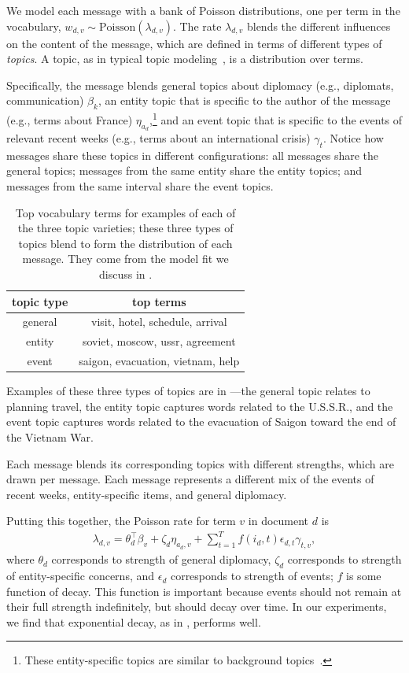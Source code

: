 We model each message with a bank of Poisson distributions, one per
term in the vocabulary, $w_{d,v} \sim \textrm{Poisson}(\lambda_{d,v})$.
The rate $\lambda_{d,v}$ blends the different influences on the
content of the message, which are defined in terms of different types
of \textit{topics}. A topic, as in typical topic modeling~\cite{Blei:2003,canny2004gap,Gopalan:2014b}, is
a distribution over terms.

Specifically, the message blends general topics about diplomacy (e.g.,
diplomats, communication) $\beta_k$, an entity topic that is specific
to the author of the message (e.g., terms about France) $\eta_{a_d}$,\footnote{These entity-specific topics are similar to background topics~\cite{paul2012model}.}
and an event topic that is specific to the events of relevant recent weeks (e.g.,
terms about an international crisis) $\gamma_t$. Notice how messages
share these topics in different configurations: all messages share the
general topics; messages from the same entity share the entity topics;
and messages from the same interval share the event topics.

\begin{table}
\centering
\small
\begin{tabular}{cc}
\toprule
topic type & top terms \\
\midrule
general & visit, hotel, schedule, arrival \\
entity & soviet, moscow, ussr, agreement \\
event & saigon, evacuation, vietnam, help \\
\bottomrule
\end{tabular}
\caption{Top vocabulary terms for examples of each of the three topic varieties; these three types of topics blend to form the distribution of each message.  They come from the model fit we discuss in .}
\label{tab:3topics}
\end{table}

Examples of these three types of topics are in ---the general topic 
relates to planning travel, the entity topic captures words related to the U.S.S.R., and 
the event topic captures words related to the evacuation of Saigon toward the end of the Vietnam War.

Each message blends its corresponding topics with different
strengths, which are drawn per message. Each message represents a
different mix of the events of recent weeks, entity-specific items, and
general diplomacy.

Putting this together, the Poisson rate for term $v$ in document $d$ is
\begin{align}
  \lambda_{d,v} = \theta_d^\top\beta_v  + \zeta_d \eta_{a_d,v} + \sum_{t=1}^T f(i_d, t) \epsilon_{d,t} \gamma_{t,v},
\label{eq:poisrate}
\end{align} where $\theta_d$ corresponds to strength of general diplomacy, $\zeta_d$ corresponds to strength of entity-specific concerns, and $\epsilon_d$ corresponds to strength of events; $f$ is some function of decay.  This function is important because events should not remain at their full strength indefinitely, but should decay over time.  In our experiments, we find that exponential decay, as in , performs well.

